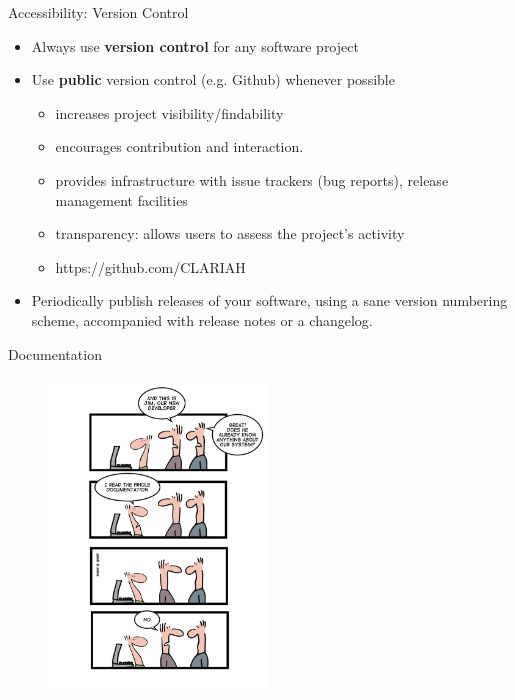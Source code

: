 \documentclass[compress]{beamer}
\begin{document}
\begin{frame}{Accessibility: Version Control}
\begin{itemize}
    \item Always use \textbf{version control} for any software project
    \item Use \textbf{public} version control (e.g. Github) whenever possible
    \begin{itemize}
        \item increases project visibility/findability
        \item encourages contribution and interaction.
        \item provides infrastructure with issue trackers (bug reports), release management facilities
        \item transparency: allows users to assess the project's activity
        \item https://github.com/CLARIAH
    \end{itemize}
    \item Periodically publish releases of your software, using a sane version
        numbering scheme, accompanied with release notes or a changelog.
\end{itemize}
\end{frame}

\begin{frame}{Documentation}
\begin{figure}
\includegraphics[height=8.3cm]{img/documentation.jpg}
\end{figure}
\end{frame}
\end{document}
